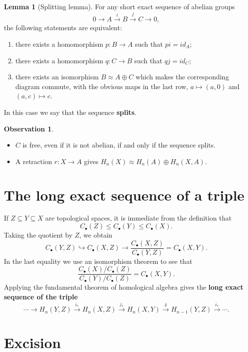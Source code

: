 \documentclass{book}
\theoremstyle{definition}
\newtheorem*{lema}{Lemma}
\newtheorem*{obs}{Observation}
\begin{document}
\begin{lema}[Splitting lemma]
For any short exact sequence of abelian groups
$$
0\to A\xrightarrow{i}B\xrightarrow{j}C\to0,
$$
the following statements are equivalent:
\begin{enumerate}
\item[(a)] there exists a homomorphism $p:B\to A$ such that
$pi=id_A$;
\item[(b)] there exists a homomorphism $q:C\to B$ such that
$qj=id_C$;
\item[(c)] there exists an isomorphism $B\approx A\oplus C$
which makes the corresponding diagram commute, with the
obvious maps in the last row, $a\mapsto(a,0)$ and
$(a,c)\mapsto c$.
\end{enumerate}
In this case we say that the sequence \textbf{splits}.
\end{lema}

\begin{obs}\leavevmode
\begin{itemize}
\item $C$ is free, even if it is not abelian, if and only if
the sequence splits.
\item A retraction $r:X\to A$ gives
$H_n(X)\approx H_n(A)\oplus H_n(X,A)$.
\end{itemize}
\end{obs}

\section{The long exact sequence of a triple}

If $Z\subseteq Y\subseteq X$ are topological spaces, it is
immediate from the definition that
$$
C_\bullet(Z)\leq C_\bullet(Y)\leq C_\bullet(X).
$$
Taking the quotient by $Z$, we obtain
$$
C_\bullet(Y,Z)\hookrightarrow C_\bullet(X,Z)
\to
\frac{C_\bullet(X,Z)}{C_\bullet(Y,Z)}=C_\bullet(X,Y).
$$
In the last equality we use an isomorphism theorem to see
that
$$
\frac{C_\bullet(X)/C_\bullet(Z)}
{C_\bullet(Y)/C_\bullet(Z)}
=
C_\bullet(X,Y).
$$
Applying the fundamental theorem of homological algebra gives
the \textbf{long exact sequence of the triple}
$$
\cdots\to H_n(Y,Z)\xrightarrow{i_*}H_n(X,Z)
\xrightarrow{j_*}H_n(X,Y)\xrightarrow{\delta}
H_{n-1}(Y,Z)\xrightarrow{i_*}\cdots.
$$

\section{Excision}\label{sec:escisión}
\end{document}

